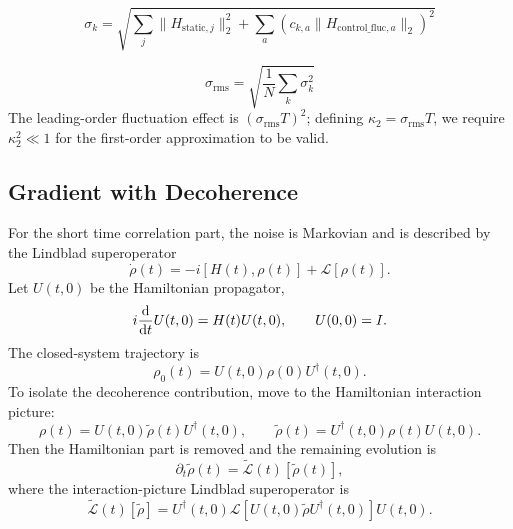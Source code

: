 \documentclass{notes2}
\begin{document}
\[\sigma_k=\sqrt{\sum_j \|H_{\mathrm{static},j}\|_2^2+\sum_a\left(
c_{k,a}\|H_{\mathrm{control\_fluc},a}\|_2
\right)^2}
\]


\[
\sigma_{\mathrm{rms}}
=
\sqrt{
\frac{1}{N}
\sum_k \sigma_k^2
}
\]
The leading-order fluctuation effect is $(\sigma_{\mathrm{rms}}T)^2$; defining $\kappa_2 = \sigma_{\mathrm{rms}}T$, we require $\kappa_2^2 \ll 1$ for the first-order approximation to be valid.


\subsection{Gradient with Decoherence}

For the short time correlation part, the noise is Markovian and is described
by the Lindblad superoperator
\begin{equation}
    \dot{\rho}(t)
    =
    -i[H(t),\rho(t)]
    +
    \mathcal{L}[\rho(t)] .
    \label{eq:lindblad_master_for_decoherence}
\end{equation}
Let $U(t,0)$ be the Hamiltonian propagator,
\begin{equation}
    i\dv{}{t}U(t,0) = H(t)U(t,0),
    \qquad
    U(0,0)=I.
\end{equation}
The closed-system trajectory is
\begin{equation}
    \rho_0(t)
    =
    U(t,0)\rho(0)U^\dagger(t,0).
\end{equation}
To isolate the decoherence contribution, move to the Hamiltonian interaction
picture:
\begin{equation}
    \rho(t)
    =
    U(t,0)\widetilde{\rho}(t)U^\dagger(t,0),
    \qquad
    \widetilde{\rho}(t)
    =
    U^\dagger(t,0)\rho(t)U(t,0).
\end{equation}
Then the Hamiltonian part is removed and the remaining evolution is
\begin{equation}
    \partial_t\widetilde{\rho}(t)
    =
    \widetilde{\mathcal{L}}(t)[\widetilde{\rho}(t)],
\end{equation}
where the interaction-picture Lindblad superoperator is
\begin{equation}
    \widetilde{\mathcal{L}}(t)[\widetilde{\rho}]
    =
    U^\dagger(t,0)
    \mathcal{L}\!\left[
        U(t,0)\widetilde{\rho}U^\dagger(t,0)
    \right]
    U(t,0).
\end{equation}
\end{document}
